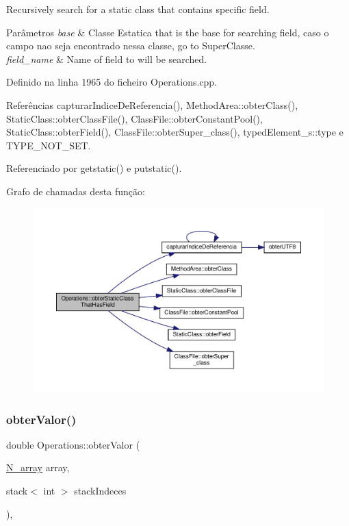 Recursively search for a static class that contains specific field. 


\begin{DoxyParams}{Parâmetros}
{\em base} & Classe Estatica that is the base for searching field, caso o campo nao seja encontrado nessa classe, go to Super\+Classe. \\
\hline
{\em field\+\_\+name} & Name of field to will be searched. \\
\hline
\end{DoxyParams}


Definido na linha 1965 do ficheiro Operations.\+cpp.



Referências capturar\+Indice\+De\+Referencia(), Method\+Area\+::obter\+Class(), Static\+Class\+::obter\+Class\+File(), Class\+File\+::obter\+Constant\+Pool(), Static\+Class\+::obter\+Field(), Class\+File\+::obter\+Super\+\_\+class(), typed\+Element\+\_\+s\+::type e T\+Y\+P\+E\+\_\+\+N\+O\+T\+\_\+\+S\+ET.



Referenciado por getstatic() e putstatic().

Grafo de chamadas desta função\+:
\nopagebreak
\begin{figure}[H]
\begin{center}
\leavevmode
\includegraphics[width=350pt]{classOperations_a2e9f822a1a6b9b0fb374eafb5a55f9f4_cgraph}
\end{center}
\end{figure}
\mbox{\label{classOperations_a926006a1873abe481d6877428355fdf2}} 
\subsubsection{\texorpdfstring{obter\+Valor()}{obterValor()}}
{\footnotesize\ttfamily double Operations\+::obter\+Valor (\begin{DoxyParamCaption}\item[{\hyperlink{structN__array}{N\+\_\+array}}]{array,  }\item[{stack$<$ int $>$}]{stack\+Indeces }\end{DoxyParamCaption})\hspace{0.3cm}{\ttfamily [static]}, {\ttfamily [private]}}



